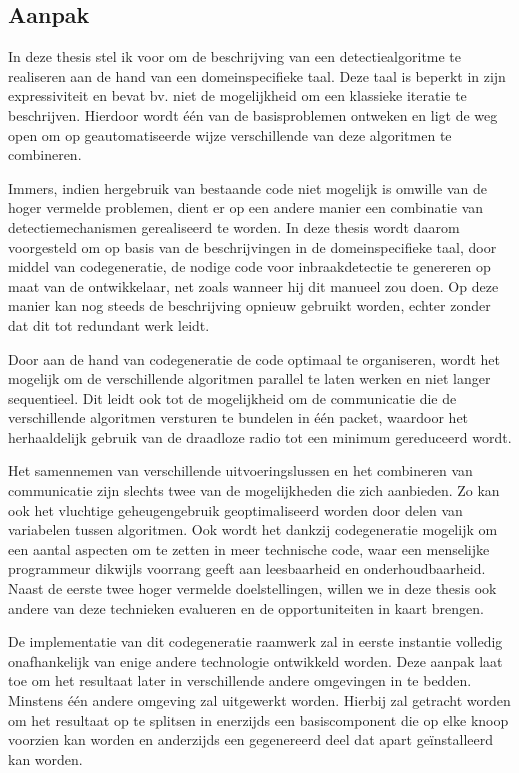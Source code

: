 \documentclass[12pt,a4paper,draft]{article}
\begin{document}
\subsection*{Aanpak}

In deze thesis stel ik voor om de beschrijving van een detectiealgoritme te
realiseren aan de hand van een domeinspecifieke taal. Deze taal is beperkt in
zijn expressiviteit en bevat bv. niet de mogelijkheid om een klassieke iteratie
te beschrijven. Hierdoor wordt \'e\'en van de basisproblemen ontweken en ligt
de weg open om op geautomatiseerde wijze verschillende van deze algoritmen te
combineren.

Immers, indien hergebruik van bestaande code niet mogelijk is omwille van de
hoger vermelde problemen, dient er op een andere manier een combinatie van
detectiemechanismen gerealiseerd te worden. In deze thesis wordt daarom
voorgesteld om op basis van de beschrijvingen in de domeinspecifieke taal, door
middel van codegeneratie, de nodige code voor inbraakdetectie te genereren op
maat van de ontwikkelaar, net zoals wanneer hij dit manueel zou doen. Op deze
manier kan nog steeds de beschrijving opnieuw gebruikt worden, echter zonder
dat dit tot redundant werk leidt.

Door aan de hand van codegeneratie de code optimaal te organiseren, wordt het
mogelijk om de verschillende algoritmen parallel te laten werken en niet langer
sequentieel. Dit leidt ook tot de mogelijkheid om de communicatie die de
verschillende algoritmen versturen te bundelen in \'e\'en packet, waardoor het
herhaaldelijk gebruik van de draadloze radio tot een minimum gereduceerd wordt.

Het samennemen van verschillende uitvoeringslussen en het combineren van
communicatie zijn slechts twee van de mogelijkheden die zich aanbieden. Zo kan
ook het vluchtige geheugengebruik geoptimaliseerd worden door delen van
variabelen tussen algoritmen. Ook wordt het dankzij codegeneratie mogelijk om
een aantal aspecten om te zetten in meer technische code, waar een menselijke
programmeur dikwijls voorrang geeft aan leesbaarheid en onderhoudbaarheid.
Naast de eerste twee hoger vermelde doelstellingen, willen we in deze thesis
ook andere van deze technieken evalueren en de opportuniteiten in kaart brengen.

De implementatie van dit codegeneratie raamwerk zal in eerste instantie
volledig onafhankelijk van enige andere technologie ontwikkeld worden. Deze
aanpak laat toe om het resultaat later in verschillende andere omgevingen in te
bedden. Minstens \'e\'en andere omgeving zal uitgewerkt worden. Hierbij zal
getracht worden om het resultaat op te splitsen in enerzijds een basiscomponent
die op elke knoop voorzien kan worden en anderzijds een gegenereerd deel dat
apart ge\"installeerd kan worden.
\end{document}
